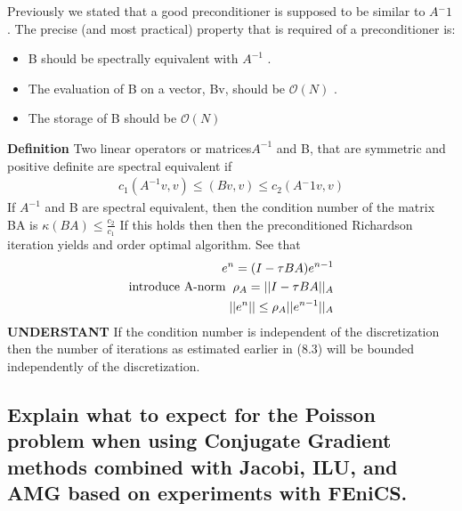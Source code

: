 \documentclass[a4paper,norsk]{article}
\begin{document}
Previously we stated that a good preconditioner is supposed to be similar to $A{^-1}$ . The precise (and
most practical) property that is required of a preconditioner is:
\begin{itemize}
\item B should be spectrally equivalent with $A^{-1}$ .
\item The evaluation of B on a vector, Bv, should be  $\mathcal{O}(N)$ .
\item The storage of B should be  $\mathcal{O}(N)$
\end{itemize}
\textbf{Definition} \newline
Two linear operators or matrices$A^{-1}$ and B, that are symmetric and positive definite are
spectral equivalent if
\begin{align*}
c_1(A^{-1} v, v) \leq (B v, v) \leq c_2 (A{^-1} v, v)
\end{align*}
If $A^{-1}$ and B are spectral equivalent, then the condition number of the matrix BA is $\kappa(BA) \leq \frac{c_2}{c_1}$  \newline
If this holds then then the preconditioned Richardson iteration yields and order optimal algorithm.
See that 
\begin{align*}
e^n = (I - \tau B A) e^{n-1} \\
\text{introduce A-norm} \hspace{2mm} \rho_A = ||I - \tau B A ||_A \\
||e^n|| \leq \rho_A ||e^{n-1}||_A
\end{align*}
\textbf{UNDERSTANT} If the condition number is independent of the discretization then the number of iterations as
estimated earlier in (8.3) will be bounded independently of the discretization.


\subsection*{Explain  what  to  expect  for  the  Poisson  problem  when  using
Conjugate Gradient methods combined with Jacobi, ILU, and AMG based
on experiments with FEniCS.}
\end{document}
